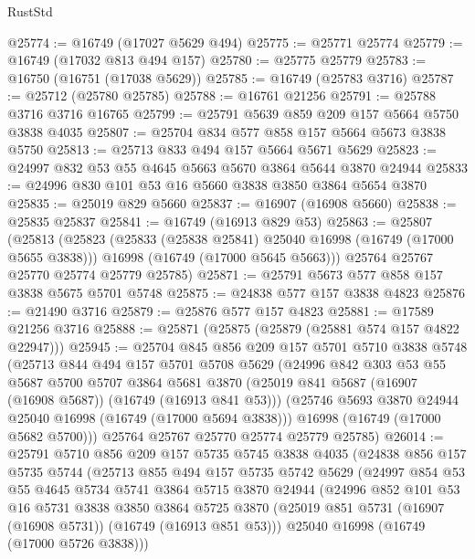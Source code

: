 \begin{lexlean}{RustStd}
\begin{coremodule}
@25774 := @16749 (@17027 @5629 @494)
@25775 := @25771 @25774
@25779 := @16749 (@17032 @813 @494 @157)
@25780 := @25775 @25779
@25783 := @16750 (@16751 (@17038 @5629))
@25785 := @16749 (@25783 @3716)
@25787 := @25712 (@25780 @25785)
@25788 := @16761 @21256
@25791 := @25788 @3716 @3716 @16765
@25799 := @25791 @5639 @859 @209 @157 @5664 @5750 @3838 @4035
@25807 := @25704 @834 @577 @858 @157 @5664 @5673 @3838 @5750
@25813 := @25713 @833 @494 @157 @5664 @5671 @5629
@25823 := @24997 @832 @53 @55 @4645 @5663 @5670 @3864 @5644 @3870 @24944
@25833 := @24996 @830 @101 @53 @16 @5660 @3838 @3850 @3864 @5654 @3870
@25835 := @25019 @829 @5660
@25837 := @16907 (@16908 @5660)
@25838 := @25835 @25837
@25841 := @16749 (@16913 @829 @53)
@25863 := @25807
    (@25813
      (@25823
        (@25833 (@25838 @25841) @25040 @16998 (@16749 (@17000 @5655 @3838)))
        @16998
        (@16749 (@17000 @5645 @5663)))
      @25764
      @25767
      @25770
      @25774
      @25779
      @25785)
@25871 := @25791 @5673 @577 @858 @157 @3838 @5675 @5701 @5748
@25875 := @24838 @577 @157 @3838 @4823
@25876 := @21490 @3716
@25879 := @25876 @577 @157 @4823
@25881 := @17589 @21256 @3716
@25888 := @25871 (@25875 (@25879 (@25881 @574 @157 @4822 @22947)))
@25945 := @25704
    @845
    @856
    @209
    @157
    @5701
    @5710
    @3838
    @5748
    (@25713
      @844
      @494
      @157
      @5701
      @5708
      @5629
      (@24996
        @842
        @303
        @53
        @55
        @5687
        @5700
        @5707
        @3864
        @5681
        @3870
        (@25019 @841 @5687 (@16907 (@16908 @5687)) (@16749 (@16913 @841 @53)))
        (@25746 @5693 @3870 @24944 @25040 @16998 (@16749 (@17000 @5694 @3838)))
        @16998
        (@16749 (@17000 @5682 @5700)))
      @25764
      @25767
      @25770
      @25774
      @25779
      @25785)
@26014 := @25791
    @5710
    @856
    @209
    @157
    @5735
    @5745
    @3838
    @4035
    (@24838
      @856
      @157
      @5735
      @5744
      (@25713
        @855
        @494
        @157
        @5735
        @5742
        @5629
        (@24997
          @854
          @53
          @55
          @4645
          @5734
          @5741
          @3864
          @5715
          @3870
          @24944
          (@24996
            @852
            @101
            @53
            @16
            @5731
            @3838
            @3850
            @3864
            @5725
            @3870
            (@25019 @851 @5731 (@16907 (@16908 @5731)) (@16749 (@16913 @851 @53)))
            @25040
            @16998
            (@16749 (@17000 @5726 @3838)))

\end{coremodule}
\end{lexlean}
